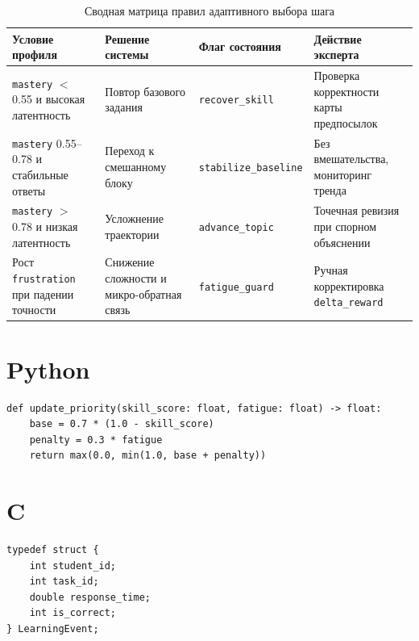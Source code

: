 \begin{table}[htbp]
  \caption{Сводная матрица правил адаптивного выбора шага}
  \label{tab:decision-rules-matrix}
  \centering

  \begin{tabular}{|p{}|p{}|p{}|p{}|}
    \hline
    Условие профиля & Решение системы & Флаг состояния & Действие эксперта \\
    \hline
    \texttt{mastery} $<$ 0.55 и высокая латентность & Повтор базового задания & \texttt{recover\_skill} & Проверка корректности карты предпосылок \\
    \hline
    \texttt{mastery} 0.55--0.78 и стабильные ответы & Переход к смешанному блоку & \texttt{stabilize\_baseline} & Без вмешательства, мониторинг тренда \\
    \hline
    \texttt{mastery} $>$ 0.78 и низкая латентность & Усложнение траектории & \texttt{advance\_topic} & Точечная ревизия при спорном объяснении \\
    \hline
    Рост \texttt{frustration} при падении точности & Снижение сложности и микро-обратная связь & \texttt{fatigue\_guard} & Ручная корректировка \texttt{delta\_reward} \\
    \hline
  \end{tabular}
\end{table}

\section*{Python}

\begin{lstlisting}[style=sthgcode-python,caption={Пример функции обновления приоритета задания}]
def update_priority(skill_score: float, fatigue: float) -> float:
    base = 0.7 * (1.0 - skill_score)
    penalty = 0.3 * fatigue
    return max(0.0, min(1.0, base + penalty))
\end{lstlisting}

\section*{C}

\begin{lstlisting}[style=sthgcode-c,caption={Пример структуры события обучения}]
typedef struct {
    int student_id;
    int task_id;
    double response_time;
    int is_correct;
} LearningEvent;
\end{lstlisting}

